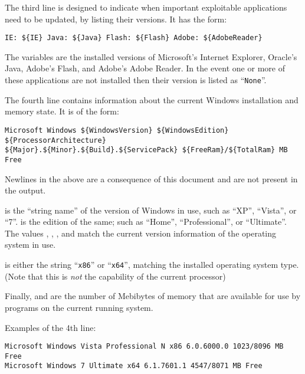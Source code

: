 The third line is designed to indicate when important exploitable applications
need to be updated, by listing their versions. It has the form:
\begin{verbatim}
IE: ${IE} Java: ${Java} Flash: ${Flash} Adobe: ${AdobeReader}
\end{verbatim}

The variables are the installed versions of Microsoft's Internet Explorer,
Oracle's Java, Adobe's Flash, and Adobe's Adobe Reader. In the event one or more
of these applications are not installed then their version is listed as
``\verb|None|''.

The fourth line contains information about the current Windows installation and
memory state. It is of the form:
\begin{verbatim}
Microsoft Windows ${WindowsVersion} ${WindowsEdition} ${ProcessorArchitecture}
${Major}.${Minor}.${Build}.${ServicePack} ${FreeRam}/${TotalRam} MB Free
\end{verbatim}

Newlines in the above are a consequence of this document and are not present in
the output.

 is the ``string name'' of the version of Windows in use,
such as ``XP'', ``Vista'', or ``7''.  is the edition of the
same; such as ``Home'', ``Professional'', or ``Ultimate''. The values
, , , and  match the current
version information of the operating system in use.

 is either the string ``\verb|x86|'' or
``\verb|x64|'', matching the installed operating system type. (Note that this is
\textit{not} the capability of the current processor)

Finally,  and  are the number of Mebibytes of memory
that are available for use by programs on the current running system.

Examples of the 4th line:
\begin{verbatim}
Microsoft Windows Vista Professional N x86 6.0.6000.0 1023/8096 MB Free
Microsoft Windows 7 Ultimate x64 6.1.7601.1 4547/8071 MB Free
\end{verbatim}

